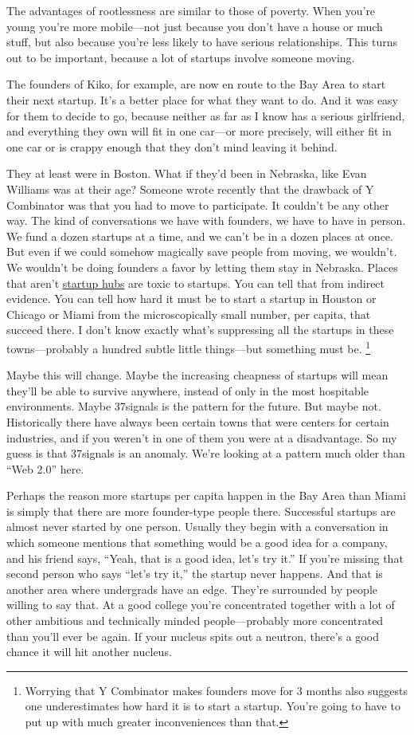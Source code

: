 The advantages of rootlessness are similar to those of poverty. When
you're young you're more mobile---not just because you don't have a
house or much stuff, but also because you're less likely to have serious
relationships. This turns out to be important, because a lot of startups
involve someone moving.

The founders of Kiko, for example, are now en route to the Bay Area to
start their next startup. It's a better place for what they want to do.
And it was easy for them to decide to go, because neither as far as I
know has a serious girlfriend, and everything they own will fit in one
car---or more precisely, will either fit in one car or is crappy enough
that they don't mind leaving it behind.

They at least were in Boston. What if they'd been in Nebraska, like Evan
Williams was at their age? Someone wrote recently that the drawback of Y
Combinator was that you had to move to participate. It couldn't be any
other way. The kind of conversations we have with founders, we have to
have in person. We fund a dozen startups at a time, and we can't be in a
dozen places at once. But even if we could somehow magically save people
from moving, we wouldn't. We wouldn't be doing founders a favor by
letting them stay in Nebraska. Places that aren't
\href{siliconvalley.html}{startup hubs} are toxic to startups. You can
tell that from indirect evidence. You can tell how hard it must be to
start a startup in Houston or Chicago or Miami from the microscopically
small number, per capita, that succeed there. I don't know exactly
what's suppressing all the startups in these towns---probably a hundred
subtle little things---but something must be. \footnote{Worrying that Y Combinator makes founders move for 3 months also
suggests one underestimates how hard it is to start a startup. You're
going to have to put up with much greater inconveniences than that.}

Maybe this will change. Maybe the increasing cheapness of startups will
mean they'll be able to survive anywhere, instead of only in the most
hospitable environments. Maybe 37signals is the pattern for the future.
But maybe not. Historically there have always been certain towns that
were centers for certain industries, and if you weren't in one of them
you were at a disadvantage. So my guess is that 37signals is an anomaly.
We're looking at a pattern much older than ``Web 2.0'' here.

Perhaps the reason more startups per capita happen in the Bay Area than
Miami is simply that there are more founder-type people there.
Successful startups are almost never started by one person. Usually they
begin with a conversation in which someone mentions that something would
be a good idea for a company, and his friend says, ``Yeah, that is a
good idea, let's try it.'' If you're missing that second person who says
``let's try it,'' the startup never happens. And that is another area
where undergrads have an edge. They're surrounded by people willing to
say that. At a good college you're concentrated together with a lot of
other ambitious and technically minded people---probably more
concentrated than you'll ever be again. If your nucleus spits out a
neutron, there's a good chance it will hit another nucleus.

